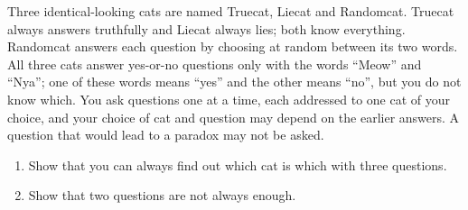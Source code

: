 Three identical-looking cats are named Truecat, Liecat and Randomcat. Truecat always answers truthfully and Liecat always lies; both know everything. Randomcat answers each question by choosing at random between its two words. All three cats answer yes-or-no questions only with the words ``Meow'' and ``Nya''; one of these words means ``yes'' and the other means ``no'', but you do not know which. You ask questions one at a time, each addressed to one cat of your choice, and your choice of cat and question may depend on the earlier answers. A question that would lead to a paradox may not be asked.
\begin{enumerate}
\item[(a)] Show that you can always find out which cat is which with three questions.
\item[(b)] Show that two questions are not always enough.
\end{enumerate}
